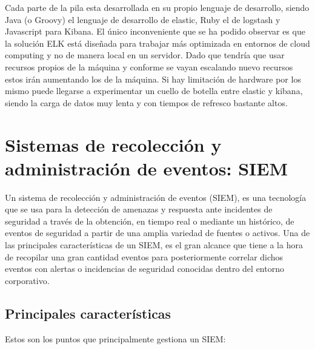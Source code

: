 Cada parte de la pila esta desarrollada en su propio lenguaje de desarrollo, siendo Java (o Groovy) el lenguaje de desarrollo de elastic, Ruby el de logstash y Javascript para Kibana. El único inconveniente que se ha podido observar es que la solución ELK está diseñada para trabajar más optimizada en entornos de cloud computing y no de manera local en un servidor. Dado que tendría que usar recursos propios de la máquina y conforme se vayan escalando nuevo recursos estos irán aumentando los de la máquina. Si hay limitación de hardware por los mismo puede llegarse a experimentar un cuello de botella entre elastic y kibana, siendo la carga de datos muy lenta y con tiempos de refresco bastante altos. \\

\section[SIEM]{Sistemas de recolección y administración de eventos: SIEM}

Un sistema de recolección y administración de eventos (SIEM), es una tecnología que se usa para la detección de amenazas y respuesta ante incidentes de seguridad a través de la obtención, en tiempo real o mediante un histórico, de eventos de seguridad a partir de una amplia variedad de fuentes o activos. Una de las principales características de un SIEM, es el gran alcance que tiene a la hora de recopilar una gran cantidad eventos para posteriormente correlar dichos eventos con alertas o incidencias de seguridad conocidas dentro del entorno corporativo.\\

\subsection{Principales características}

Estos son los puntos que principalmente gestiona un SIEM:\\

